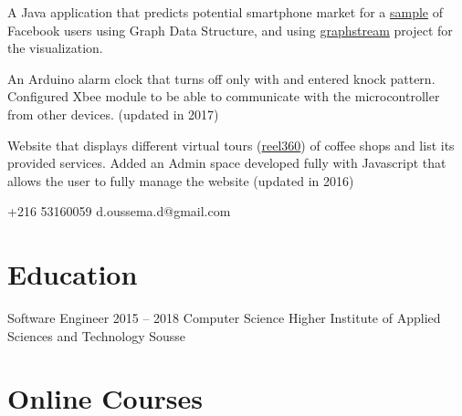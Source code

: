 \documentclass{tccv}
\begin{document}
\begin{eventlist}


A Java application that predicts potential smartphone market for a \href{http://snap.stanford.edu/data/egonets-Facebook.html}{sample} of Facebook users using Graph Data Structure, and using \href{http://graphstream-project.org/}{graphstream} project for the visualization.




An Arduino alarm clock that turns off only with and entered knock pattern.
Configured Xbee module to be able to communicate with the microcontroller from other devices. (updated in 2017)



Website that displays different virtual tours (\href{http://reel360.org/reel}{reel360}) of coffee shops and list its provided services.
Added an Admin space developed fully with Javascript that allows the user to fully manage the website (updated in 2016)




\end{eventlist}

    {+216 53160059}
    {d.oussema.d@gmail.com}

\section{Education}

\begin{yearlist}

\item[Software Engineer]{2015 -- 2018}
     {Computer Science}
     {Higher Institute of Applied Sciences and Technology Sousse}

\end{yearlist}


\section{Online Courses}
\end{document}
